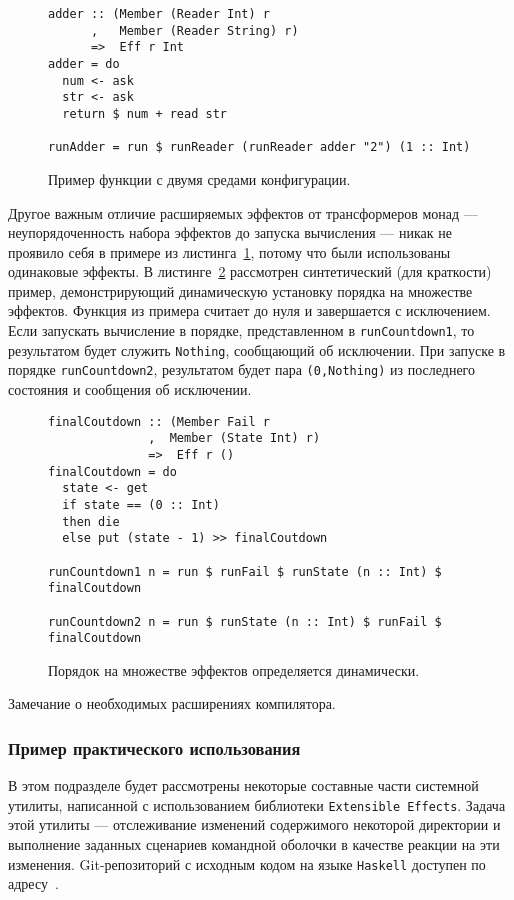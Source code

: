 \begin{figure}[t]
\begin{lstlisting}
adder :: (Member (Reader Int) r
      ,   Member (Reader String) r)
      =>  Eff r Int
adder = do
  num <- ask
  str <- ask
  return $ num + read str

runAdder = run $ runReader (runReader adder "2") (1 :: Int)
\end{lstlisting}
\caption{Пример функции с двумя средами конфигурации.}
\label{listing:extEff2Readers}
\end{figure}

Другое важным отличие расширяемых эффектов от трансформеров монад --- неупорядоченность набора эффектов до запуска вычисления --- никак не проявило себя в примере из листинга~\ref{listing:extEff2Readers}, потому что были использованы одинаковые эффекты. В листинге~\ref{listing:extEffOrdering} рассмотрен синтетический (для краткости) пример, демонстрирующий динамическую установку порядка на множестве эффектов. Функция из примера считает до нуля и завершается с исключением. Если запускать вычисление в порядке, представленном в \lstinline{runCountdown1}, то результатом будет служить \lstinline{Nothing}, сообщающий об исключении. При запуске в порядке \lstinline{runCountdown2}, результатом будет пара \lstinline{(0,Nothing)} из последнего состояния и сообщения об исключении.

\begin{figure}[t]
\begin{lstlisting}
finalCoutdown :: (Member Fail r
              ,  Member (State Int) r)
              =>  Eff r ()
finalCoutdown = do
  state <- get
  if state == (0 :: Int)
  then die
  else put (state - 1) >> finalCoutdown

runCountdown1 n = run $ runFail $ runState (n :: Int) $ finalCoutdown

runCountdown2 n = run $ runState (n :: Int) $ runFail $ finalCoutdown
\end{lstlisting}
\caption{Порядок на множестве эффектов определяется динамически.}
\label{listing:extEffOrdering}
\end{figure}

Замечание о необходимых расширениях компилятора.

\subsubsection{Пример практического использования}

В этом подразделе будет рассмотрены некоторые составные части системной утилиты, написанной с использованием библиотеки \lstinline{Extensible Effects}. Задача этой утилиты --- отслеживание изменений содержимого некоторой директории и выполнение заданных сценариев командной оболочки в качестве реакции на эти изменения. Git-репозиторий с исходным кодом на языке \lstinline{Haskell} доступен по адресу~\autocite{FileTrigger}.

